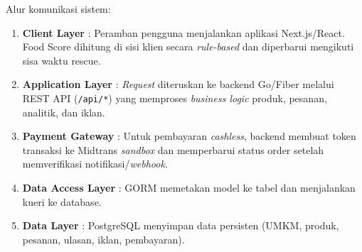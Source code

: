Alur komunikasi sistem:
\begin{enumerate}[leftmargin=*]
    \item \textbf{Client Layer} : Peramban pengguna menjalankan aplikasi Next.js/React. Food Score dihitung di sisi klien secara \textit{rule-based} dan diperbarui mengikuti sisa waktu rescue.
    \item \textbf{Application Layer} : \textit{Request} diteruskan ke backend Go/Fiber melalui REST API (\texttt{/api/*}) yang memproses \textit{business logic} produk, pesanan, analitik, dan iklan.
    \item \textbf{Payment Gateway} : Untuk pembayaran \textit{cashless}, backend membuat token transaksi ke Midtrans \textit{sandbox} dan memperbarui status order setelah memverifikasi notifikasi/\textit{webhook}.
    \item \textbf{Data Access Layer} : GORM memetakan model ke tabel dan menjalankan kueri ke database.
    \item \textbf{Data Layer} : PostgreSQL menyimpan data persisten (UMKM, produk, pesanan, ulasan, iklan, pembayaran).
\end{enumerate}
